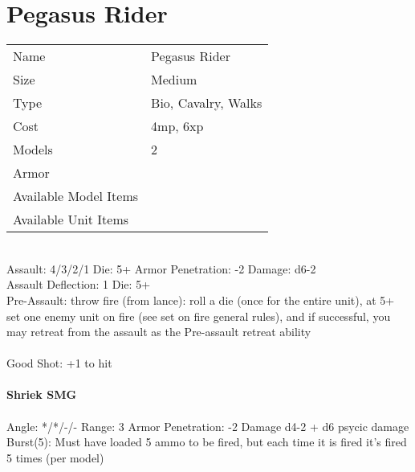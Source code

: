 






\pagebreak

\section{ Pegasus Rider }

\begin{tabular}{ll}
  Name & Pegasus Rider \\
  Size & Medium\\
  Type & Bio, Cavalry, Walks\\
  Cost & 4mp, 6xp\\
  Models & 2\\
  Armor & \\
  Available Model Items &  \\
  Available Unit Items &  \\
\end{tabular}

\ \\
Assault: 4/3/2/1 Die: 5+ Armor Penetration: -2 Damage: d6-2 \\
Assault Deflection: 1 Die: 5+\\
\indent Pre-Assault: throw fire (from lance): roll a die (once for the entire unit), at 5+ set one enemy unit on fire (see set on fire general rules), and if successful, you may retreat from the assault as the Pre-assault retreat ability \\
\ \\
Good Shot: +1 to hit
\ \\
\ \\
{\bf Shriek SMG } \\
\ \\
Angle: */*/-/- Range: 3 Armor Penetration: -2 Damage d4-2 + d6 psycic damage \\
\indent Burst(5): Must have loaded 5 ammo to be fired, but each time it is fired it's fired 5 times (per model) \\





